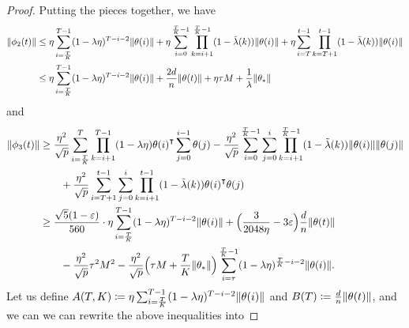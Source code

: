 \begin{proof}
    
    Putting the pieces together, we have
    \begin{align*}
        \|\phi_{2}(t)\| & \leq  \eta\sum_{i=\frac{T}{K}}^{T-1} (1-\lambda\eta)^{T-i-2} \|\theta(i)\| + \eta\sum_{i=0}^{\frac{T}{K}-1}\prod_{k=i+1}^{\frac{T}{K}-1}(1-\tlam(k)) \|\theta(i)\| + \eta\sum_{i=T}^{t-1} \prod_{k=T+1}^{t-1}(1-\tlam(k)) \|\theta(i)\| \\
        & \leq \eta\sum_{i=\frac{T}{K}}^{T-1} (1-\lambda\eta)^{T-i-2} \|\theta(i)\| + \frac{2d}{n} \|\theta(t)\| + \eta\tau M + \frac{1}{\lambda} \|\theta_*\| 
    \end{align*}
    and 
    \begin{align*}
        \|\phi_{3}(t)\| 
        & \geq \frac{\eta^2}{\sqrt p}\sum_{i=\frac{T}{K}}^{T}\prod_{k=i+1}^{T-1}(1-\lambda\eta)\theta(i)\transpose\sum_{j=0}^{i-1} \theta(j) - \frac{\eta^2}{\sqrt p}\sum_{i=0}^{\frac{T}{K}-1}\sum_{j=0}^i\prod_{k=i+1}^{\frac{T}{K}-1}(1-\tlam(k)) \|\theta(i)\|\|\theta(j)\| \\
        & \qquad + \frac{\eta^2}{\sqrt p}\sum_{i=T+1}^{t-1}\sum_{j=0}^i\prod_{k=i+1}^{t-1}(1-\tlam(k)) \theta(i)\transpose \theta(j) \\
        & \geq \frac{\sqrt{5}(1-\eps)}{560} \cdot \eta\sum_{i=\frac{T}{K}}^{T-1}(1-\lambda\eta)^{T-i-2} \|\theta(i)\| + \Big( \frac{3}{2048\eta} - 3\eps \Big) \frac{d}{n} \|\theta(t)\| \\
        & \qquad - \frac{\eta^2}{\sqrt p} \tau^2 M^2 - \frac{\eta^2}{\sqrt p} \Big( \tau M + \frac{T}{K} \|\theta_*\| \Big) \sum_{i=\tau}^{\frac{T}{K}-1}(1 - \lambda\eta)^{\frac{T}{K}-i-2} \|\theta(i)\|.
    \end{align*}
    Let us define $A(T,K) \defeq \eta\sum_{i=\frac{T}{K}}^{T-1}(1-\lambda\eta)^{T-i-2} \|\theta(i)\|$ and $B(T) \defeq \frac{d}{n} \|\theta(t)\|$, and we can we can rewrite the above inequalities into

\end{proof}
